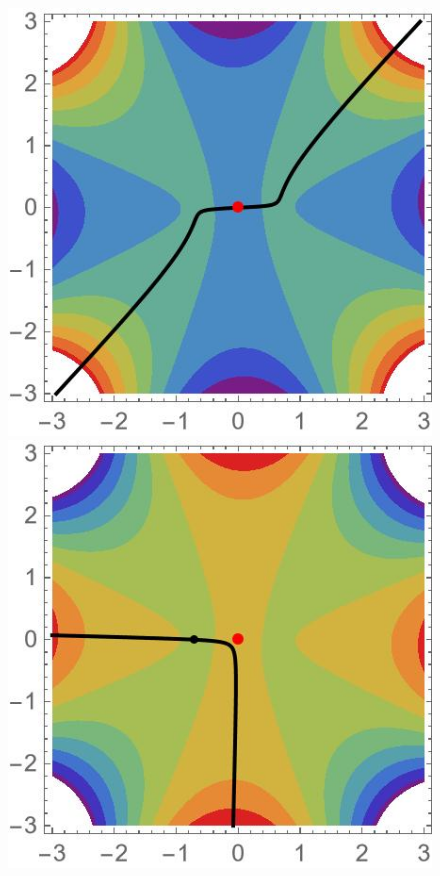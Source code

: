 \documentclass{article}
\theoremstyle{definition}
\theoremstyle{plain}
\begin{document}
\begin{figure}[ht]
    \centering
    \includegraphics[scale=0.4]{figures/contour1-AL4--12.jpg}
    \includegraphics[scale=0.4]{figures/contour2-AL4--12.jpg}

\end{figure}
\end{document}
